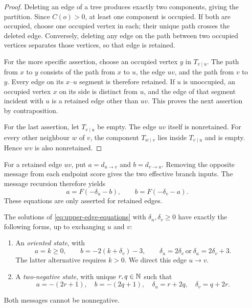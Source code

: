 \begin{proof}
Deleting an edge of a tree produces exactly two components, giving the
partition.  Since $C(o)>0$, at least one component is occupied.  If both
are occupied, choose one occupied vertex in each; their unique path crosses
the deleted edge.  Conversely, deleting any edge on the path between two
occupied vertices separates those vertices, so that edge is retained.

For the more specific assertion, choose an occupied vertex $y$ in
$T_{v\mid u}$.  The path from $x$ to $y$ consists of the path from $x$ to
$u$, the edge $uv$, and the path from $v$ to $y$.  Every edge on its
$x$--$u$ segment is therefore retained.  If $u$ is unoccupied, an occupied
vertex $x$ on its side is distinct from $u$, and the edge of that
segment incident with $u$ is a retained edge other than $uv$.  This proves
the next assertion by contraposition.

For the last assertion, let $T_{v\mid u}$ be empty.  The edge $uv$ itself
is nonretained.  For every other neighbour $w$ of $v$, the component
$T_{w\mid v}$ lies inside $T_{v\mid u}$ and is empty.  Hence $wv$ is
also nonretained.
\end{proof}

For a retained edge $uv$, put $a=d_{u\to v}$ and $b=d_{v\to u}$.
Removing the opposite message from each endpoint score gives the two
effective branch inputs.  The message recursion therefore yields
\begin{equation}\label{eq:upper-edge-equations}
 a=F(-\delta_u-b),\qquad b=F(-\delta_v-a).
\end{equation}
These equations are only asserted for retained edges.

\begin{lemma}\label{lem:upper-classification}
The solutions of \eqref{eq:upper-edge-equations} with
$\delta_u,\delta_v\geq0$ have exactly the following forms, up to exchanging
$u$ and $v$:
\begin{enumerate}
 \item An \emph{oriented state}, with
 \begin{equation}\label{eq:upper-oriented}
 a=k\geq0,\qquad b=-2(k+\delta_v)-3,
 \qquad
 \delta_u=2\delta_v\ \text{or}\ \delta_u=2\delta_v+3.
 \end{equation}
 The latter alternative requires $k>0$.  We direct this edge $u\to v$.
 \item A \emph{two-negative state}, with unique $r,q\in\mathbb N$ such that
 \begin{equation}\label{eq:upper-negative}
 a=-(2r+1),\quad b=-(2q+1),\quad
 \delta_u=r+2q,\quad\delta_v=q+2r.
 \end{equation}
\end{enumerate}
Both messages cannot be nonnegative.
\end{lemma}

